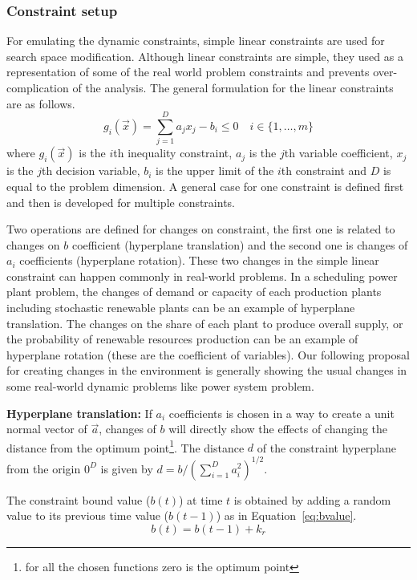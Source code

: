 \documentclass[conference]{IEEEtran}
\begin{document}
\subsubsection{Constraint setup}
For emulating the dynamic constraints, simple linear constraints are used for search space modification. Although linear constraints are simple, they used as a representation of some of the real world problem constraints and prevents over-complication of the analysis. The general formulation for the linear constraints are as follows. 
 \begin{equation}
g_i(\vec{x})=\sum\limits_{j=1}^{D} a_j x_j-b_i \le 0 \quad  i \in\{ 1, \ldots, m\} 
 \end{equation}
where $g_i(\vec{x})$ is the $i$th inequality constraint, $a_j$ is the $j$th variable coefficient, $x_j$ is the $j$th decision variable, $b_i$ is the upper limit of the $i$th  constraint and $D$ is equal to the problem dimension.
A general case for one constraint is defined first and then is developed for multiple constraints. 

Two operations are defined for changes on constraint, the first one is related to changes on $b$ coefficient (hyperplane translation) and the second one is changes of $a_i$ coefficients (hyperplane rotation). 
These two changes in the simple linear constraint can happen commonly in real-world problems. In a scheduling power plant problem, the changes of demand or capacity of each production plants including stochastic renewable plants can be an example of hyperplane translation. The changes on the share of each plant to produce overall supply, or the probability of renewable resources production can be an example of hyperplane rotation (these are the coefficient of variables). Our following proposal for creating changes in the environment is generally showing the usual changes in some real-world dynamic problems like power system problem. 
 
\textbf{Hyperplane translation:}
If $a_i$ coefficients is chosen in a way to create a unit normal vector of $\vec{a}$, changes of $b$ will directly show the effects of changing the distance from the optimum point\footnote{for all the chosen functions zero is the optimum point}. The distance $d$ of the constraint hyperplane from the origin $0^D$ is given by
$	d=b/\left(\sum\limits_{i=1}^{D} a_i^{2}\right)^{1/2}.$

The constraint bound value ($b(t)$) at time $t$ is obtained by adding a random value to its previous time value ($b(t-1)$) as in Equation~\ref{eq:bvalue}.  
\begin{equation}
\label{eq:bvalue}
	b(t)=b(t-1)+k_{r}
\end{equation}
\end{document}
